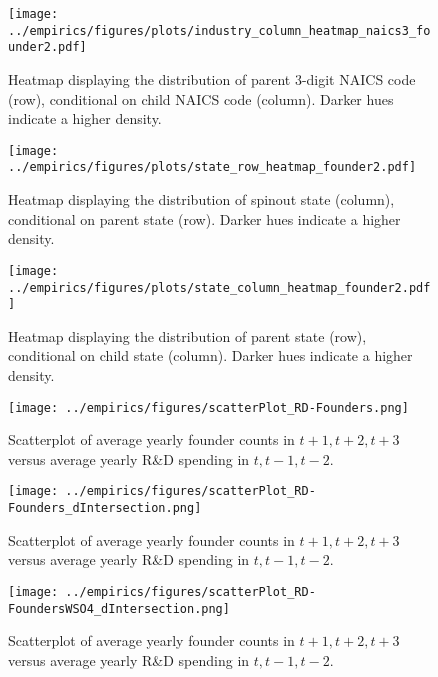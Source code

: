 \documentclass[12pt,english]{article}
\theoremstyle{remark}
\begin{document}
\begin{figure}[!htb]
	\centering
	\texttt{[image: ../empirics/figures/plots/industry\_column\_heatmap\_naics3\_founder2.pdf]}
	\caption{Heatmap displaying the distribution of parent 3-digit NAICS code (row), conditional on child NAICS code (column). Darker hues indicate a higher density.}
	\label{figure:industry_column_heatmap_naics3_founder2}
\end{figure}


\begin{figure}[!htb]
	\centering
	\texttt{[image: ../empirics/figures/plots/state\_row\_heatmap\_founder2.pdf]}
	\caption{Heatmap displaying the distribution of spinout state (column), conditional on parent state (row). Darker hues indicate a higher density.}
	\label{figure:state_row_heatmap_founder2}
\end{figure}

\begin{figure}[!htb]
	\centering
	\texttt{[image: ../empirics/figures/plots/state\_column\_heatmap\_founder2.pdf]}
	\caption{Heatmap displaying the distribution of parent state (row), conditional on child state (column). Darker hues indicate a higher density.}
	\label{figure:state_column_heatmap_founder2}
\end{figure}

\begin{figure}[!htb]
	\centering
	\texttt{[image: ../empirics/figures/scatterPlot\_RD-Founders.png]}
	\caption{Scatterplot of average yearly founder counts in $t+1,t+2,t+3$ versus average yearly R\&D spending in $t,t-1,t-2$.}
	\label{figure:scatterPlot_RD-Founders}
\end{figure}

\begin{figure}[!htb]
	\centering
	\texttt{[image: ../empirics/figures/scatterPlot\_RD-Founders\_dIntersection.png]}
	\caption{Scatterplot of average yearly founder counts in $t+1,t+2,t+3$ versus average yearly R\&D spending in $t,t-1,t-2$.}
	\label{figure:scatterPlot_RD-Founders_dIntersection}
\end{figure}

\begin{figure}[!htb]
	\centering
	\texttt{[image: ../empirics/figures/scatterPlot\_RD-FoundersWSO4\_dIntersection.png]}
	\caption{Scatterplot of average yearly founder counts in $t+1,t+2,t+3$ versus average yearly R\&D spending in $t,t-1,t-2$.}
	\label{figure:scatterPlot_RD-FoundersWSO4_dIntersection}
\end{figure}
\end{document}
